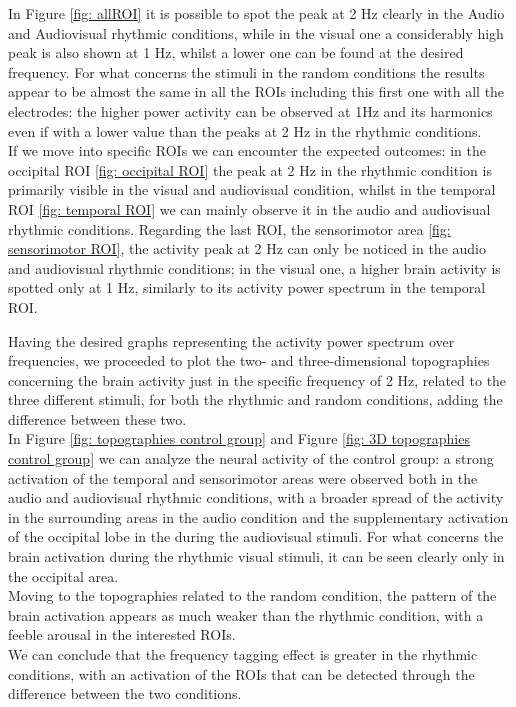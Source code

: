 In Figure \ref{fig: allROI} it is possible to spot the peak at 2 Hz clearly in the Audio and Audiovisual rhythmic conditions, while in the visual one a considerably high peak is also shown at 1 Hz, whilst a lower one can be found at the desired frequency. 
For what concerns the stimuli in the random conditions the results appear to be almost the same in all the ROIs including this first one with all the electrodes: the higher power activity can be observed at 1Hz and its harmonics even if with a lower value than the peaks at 2 Hz in the rhythmic conditions. \\
If we move into specific ROIs we can encounter the expected outcomes: in the occipital ROI \ref{fig: occipital ROI} the peak at 2 Hz in the rhythmic condition is primarily visible in the visual and audiovisual condition, whilst in the temporal ROI \ref{fig: temporal ROI} we can mainly observe it in the audio and audiovisual rhythmic conditions. Regarding the last ROI, the sensorimotor area \ref{fig: sensorimotor ROI}, the activity peak at 2 Hz can only be noticed in the audio and audiovisual rhythmic conditions; in the visual one, a higher brain activity is spotted only at 1 Hz, similarly to its activity power spectrum in the temporal ROI.

Having the desired graphs representing the activity power spectrum over frequencies, we proceeded to plot the two- and three-dimensional topographies concerning the brain activity just in the specific frequency of 2 Hz, related to the three different stimuli, for both the rhythmic and random conditions, adding the difference between these two. \\
In Figure \ref{fig: topographies control group} and Figure \ref{fig: 3D topographies control group} we can analyze the neural activity of the control group: a strong activation of the temporal and sensorimotor areas were observed both in the audio and audiovisual rhythmic conditions, with a broader spread of the activity in the surrounding areas in the audio condition and the supplementary activation of the occipital lobe in the during the audiovisual stimuli. For what concerns the brain activation during the rhythmic visual stimuli, it can be seen clearly only in the occipital area. \\
Moving to the topographies related to the random condition, the pattern of the brain activation appears as much weaker than the rhythmic condition, with a feeble arousal in the interested ROIs. \\
We can conclude that the frequency tagging effect is greater in the rhythmic conditions, with an activation of the ROIs that can be detected through the difference between the two conditions. 

